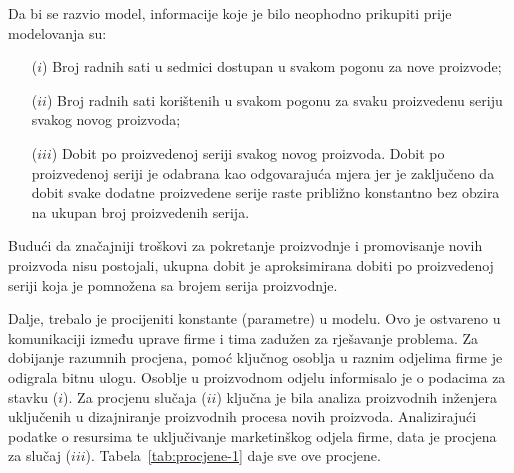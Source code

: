 \documentclass[a4paper, utf8, 11pt, colorlinks]{book}
\begin{document}
Da bi se razvio model, informacije koje je bilo neophodno prikupiti prije modelovanja su:
\begin{itemize}
	\item[($i$)]   Broj radnih sati u sedmici dostupan u svakom pogonu za nove proizvode;  
	\item[($ii$)]   Broj radnih sati korištenih u svakom pogonu za svaku proizvedenu seriju svakog novog proizvoda;
	\item[($iii$)] Dobit po proizvedenoj seriji svakog novog proizvoda. Dobit po proizvedenoj seriji je  odabrana   kao odgovarajuća mjera jer je zaključeno da   dobit svake dodatne proizvedene serije  raste približno konstantno bez obzira na ukupan broj proizvedenih serija.
\end{itemize} 

Budući da značajniji troškovi za pokretanje proizvodnje i promovisanje novih proizvoda nisu postojali, ukupna dobit je aproksimirana dobiti po proizvedenoj seriji koja je pomnožena sa brojem serija proizvodnje.  

Dalje, trebalo je procijeniti konstante (parametre)  u modelu. Ovo je ostvareno u komunikaciji između uprave firme i tima zadužen za rješavanje problema. 
Za dobijanje razumnih procjena, pomoć ključnog osoblja u raznim odjelima firme je odigrala bitnu ulogu. Osoblje u proizvodnom odjelu informisalo  je o podacima za stavku ($i$). Za procjenu slučaja ($ii$) ključna je bila analiza proizvodnih inženjera uključenih u dizajniranje proizvodnih procesa novih proizvoda. Analizirajući podatke o resursima te uključivanje  marketinškog odjela firme,  data je procjena za slučaj ($iii$). Tabela~\ref{tab:procjene-1} daje sve ove procjene. 


\begin{table}[!ht]
    \centering
    \caption{Procjene konstanti modela.}
    \label{tab:procjene-1}
\end{table}
\end{document}
